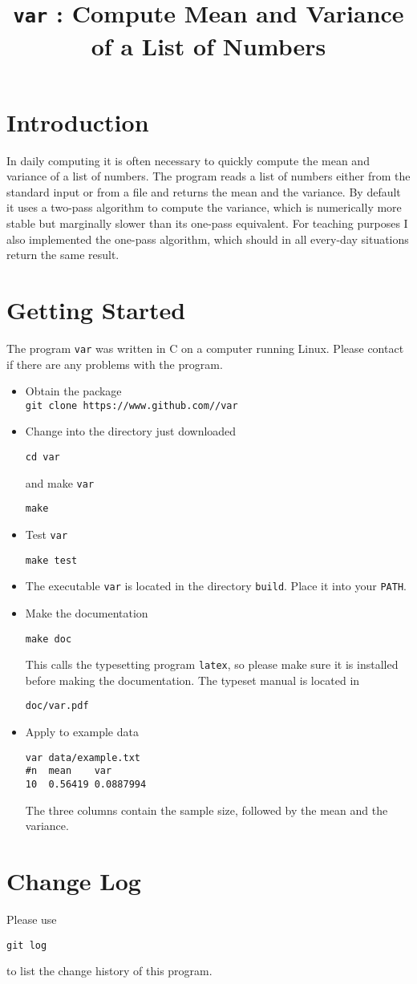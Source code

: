 \documentclass[a4paper, english]{article}
\begin{document}
\title{\texttt{var} : Compute Mean and Variance of a List of Numbers}
\author{}

\date{}
\maketitle

\section{Introduction} 
In daily computing it is often necessary to quickly compute the mean
and variance of a list of numbers. The program  reads a list
of numbers either from the standard input or from a file and returns
the mean and the variance. By default it uses a two-pass algorithm to
compute the variance, which is numerically more stable but marginally
slower than its one-pass equivalent. For teaching purposes I also
implemented the one-pass algorithm, which should in all every-day
situations return the same result.

\section{Getting Started}
The program \texttt{var} was written in C on a computer running Linux.
Please contact \texttt{} if there are any problems
with the program.
\begin{itemize}
\item Obtain the package\\
\texttt{git clone https://www.github.com//var}
\item Change into the directory just downloaded
\begin{verbatim}
cd var
\end{verbatim}
and make \texttt{var}
\begin{verbatim}
make
\end{verbatim}
\item Test \texttt{var}
\begin{verbatim}
make test
\end{verbatim}
\item The executable \texttt{var} is located in the
  directory \texttt{build}. Place it into your \texttt{PATH}.
\item Make the documentation
\begin{verbatim}
make doc
\end{verbatim}
This calls the typesetting program \texttt{latex}, so please make sure
it is installed before making the documentation. The typeset manual is
located in
\begin{verbatim}
doc/var.pdf
\end{verbatim}
\item Apply to example data
\begin{verbatim}
var data/example.txt
#n	mean	var
10	0.56419	0.0887994
\end{verbatim}
The three columns contain the sample size, followed by the mean and
the variance.
\end{itemize}

\section{Change Log}
Please use
\begin{verbatim}
git log
\end{verbatim}
to list the change history of this program.

\end{document}
